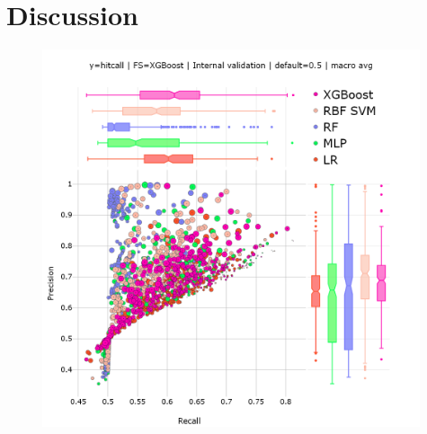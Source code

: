 \section{Discussion}
\begin{figure}
  \centering
  \includegraphics[width=0.99\textwidth]{generated_results/hitcall_classification_Feature_Selection_XGBClassifier_val_default_macro_avg.png}
  \caption{}
~\label{fig:hitcall_classification_Feature_Selection_XGBClassifier_val_default_macro_avg}
\end{figure}















